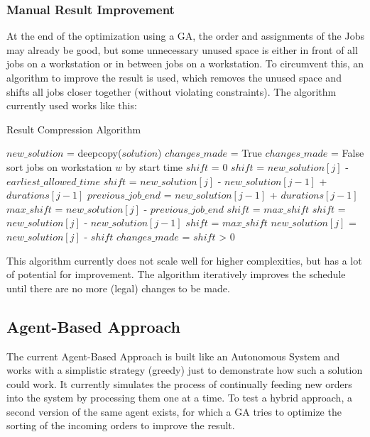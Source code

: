 \documentclass[a4paper,12pt,twoside]{scrreprt}
\begin{document}
\begin{flushleft}
\subsubsection{Manual Result Improvement}
At the end of the optimization using a GA, the order and assignments of the Jobs may already be good, but some unnecessary unused space is either in front of all jobs on a workstation or in between jobs on a workstation. To circumvent this, an algorithm to improve the result is used, which removes the unused space and shifts all jobs closer together (without violating constraints).
The algorithm currently used works like this:
\begin{algorithm}[H]
	\label{Result Compression Algorithm}
	\caption{Result Compression Algorithm}
\begin{algorithmic}
	\STATE $new\_solution$ = deepcopy($solution$)
	\STATE $changes\_made$ = True
		\STATE $changes\_made$ = False
			\STATE sort jobs on workstation $w$ by start time
					\STATE $shift$ = 0
						\STATE $shift$ = $new\_solution[j]$ - $earliest\_allowed\_time$
					\ELSE
						\STATE $shift$ = $new\_solution[j]$ - $new\_solution[j-1]$ + $durations[j-1]$
					\ENDIF
				\ELSE
					\STATE $previous\_job\_end$ = $new\_solution[j-1]$ + $durations[j-1]$
					\STATE $max\_shift$ = $new\_solution[j]$ - $previous\_job\_end$
						\STATE $shift$ = $max\_shift$
					\ELSE
						\STATE $shift$ = $new\_solution[j]$ - $new\_solution[j-1]$
							\STATE $shift$ = $max\_shift$
						\ENDIF
					\ENDIF
				\ENDIF
				\STATE $new\_solution[j]$ = $new\_solution[j]$ - $shift$
				\STATE $changes\_made$ = $shift$ > 0
			\ENDFOR
		\ENDFOR
	\ENDWHILE
\end{algorithmic}
\end{algorithm}
This algorithm currently does not scale well for higher complexities, but has a lot of potential for improvement.
The algorithm iteratively improves the schedule until there are no more (legal) changes to be made.

\subsection{Agent-Based Approach}

The current Agent-Based Approach is built like an Autonomous System and works with a simplistic strategy (greedy) just to demonstrate how such a solution could work.
It currently simulates the process of continually feeding new orders into the system by processing them one at a time.
To test a hybrid approach, a second version of the same agent exists, for which a GA tries to optimize the sorting of the incoming orders to improve the result. 


\end{flushleft}
\end{document}

